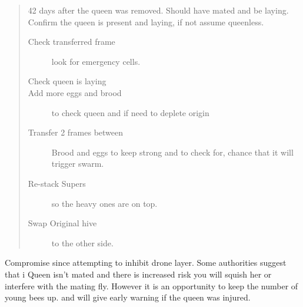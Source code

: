 \begin{quotation}
42 days after the queen was removed.
Should have mated and be laying.
Confirm the queen is present and laying,
if not assume queenless.

\begin{description}
  \item[Check transferred frame] look for emergency cells.
  \item[Check queen is laying] 
  \item[Add more eggs and brood] to check queen and if need to deplete origin
  \item[Transfer 2 frames between] Brood and eggs to keep strong and to check for, chance that it will trigger swarm.
  \item[Re-stack Supers] so the heavy ones are on top.
  \item[Swap Original hive] to the other side.
\end{description}
\end{quotation}

Compromise since attempting to inhibit drone layer.
Some authorities suggest that i
Queen isn't mated and there is increased risk you will squish her or interfere with the mating fly.
However it is an opportunity to keep the number of young bees up.
and will give early warning if the queen was injured.

